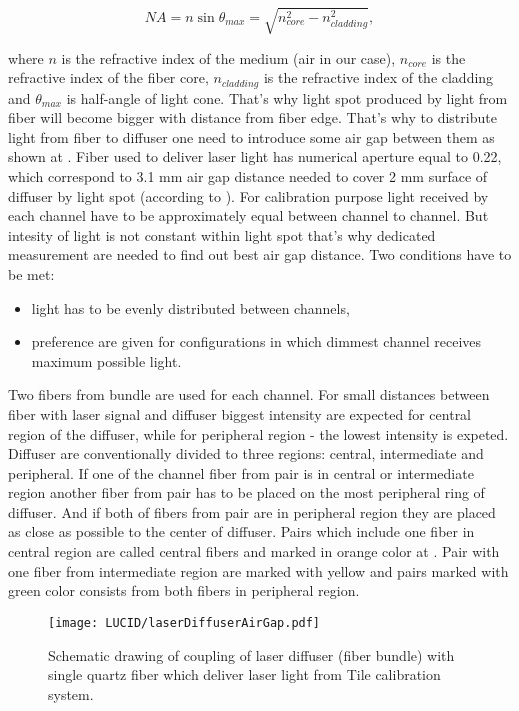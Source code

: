 \begin{equation}
\label{eq:numericalApperture}
 NA = n \sin{\theta_{max}} = \sqrt{n_{core}^2 - n_{cladding}^2},
\end{equation}

where $n$ is the refractive index of the medium (air in our case), $n_{core}$ is the refractive index of the fiber core, $n_{cladding}$ is the refractive index of the cladding
and $\theta_{max}$ is half-angle of light cone. That's why light spot produced by light from fiber will become bigger with distance from fiber edge. 
That's why to distribute light from fiber to diffuser one need to introduce some air gap between them as shown at .
Fiber used to deliver laser light has numerical aperture equal to 0.22, which correspond to 3.1 mm air gap distance needed to cover 2 mm surface of diffuser by light spot
(according to ).
For calibration purpose light received by each channel have to be approximately equal between channel to channel. But intesity of light is not constant within light spot
that's why dedicated measurement are needed to find out best air gap distance.
Two conditions have to be met:
\begin{itemize}
 \item light has to be evenly distributed between channels,
 \item preference are given for configurations in which dimmest channel receives maximum possible light.
\end{itemize}
Two fibers from bundle are used for each channel. For small distances between fiber with laser signal and diffuser biggest intensity are expected for central region of the diffuser, 
while for peripheral region - the lowest intensity is expeted. 
Diffuser are conventionally divided to three regions: central, intermediate and peripheral. 
If one of the channel fiber from pair is in central or intermediate region another fiber from pair has to be placed on the most peripheral ring of diffuser.
And if both of fibers from pair are in peripheral region they are placed as close as possible to the center of diffuser.
Pairs which include one fiber in central region are called central fibers and marked in orange color at .
Pair with one fiber from intermediate region are marked with yellow and pairs marked with green color consists from both fibers in peripheral region.

\begin{figure}
\centering
\texttt{[image: LUCID/laserDiffuserAirGap.pdf]}
\caption{Schematic drawing of coupling of laser diffuser (fiber bundle) with single quartz fiber which deliver laser light from Tile calibration system.}
\label{fig:laserDiffuserSchematics}
\end{figure}


